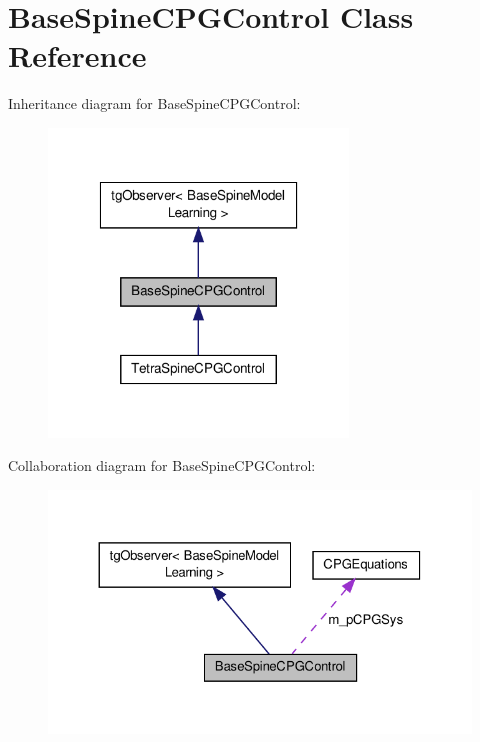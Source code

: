 \hypertarget{class_base_spine_c_p_g_control}{\section{Base\-Spine\-C\-P\-G\-Control Class Reference}
\label{class_base_spine_c_p_g_control}
}


Inheritance diagram for Base\-Spine\-C\-P\-G\-Control\-:\nopagebreak
\begin{figure}[H]
\begin{center}
\leavevmode
\includegraphics[width=226pt]{class_base_spine_c_p_g_control__inherit__graph}
\end{center}
\end{figure}


Collaboration diagram for Base\-Spine\-C\-P\-G\-Control\-:\nopagebreak
\begin{figure}[H]
\begin{center}
\leavevmode
\includegraphics[width=326pt]{class_base_spine_c_p_g_control__coll__graph}
\end{center}
\end{figure}

